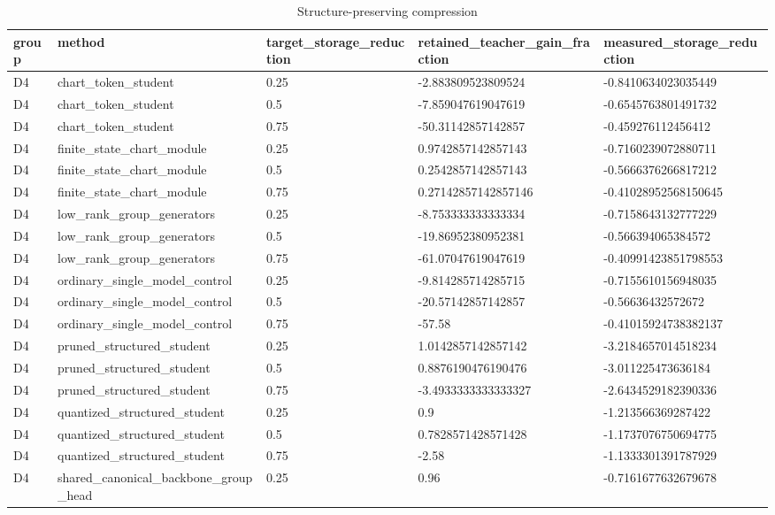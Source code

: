 \begin{table}[t]
\centering
\caption{Structure-preserving compression}
\begin{tabular}{lllll}
\toprule
group & method & target\_storage\_reduction & retained\_teacher\_gain\_fraction & measured\_storage\_reduction \\
\midrule
D4 & chart\_token\_student & 0.25 & -2.883809523809524 & -0.8410634023035449 \\
D4 & chart\_token\_student & 0.5 & -7.859047619047619 & -0.6545763801491732 \\
D4 & chart\_token\_student & 0.75 & -50.31142857142857 & -0.459276112456412 \\
D4 & finite\_state\_chart\_module & 0.25 & 0.9742857142857143 & -0.7160239072880711 \\
D4 & finite\_state\_chart\_module & 0.5 & 0.2542857142857143 & -0.5666376266817212 \\
D4 & finite\_state\_chart\_module & 0.75 & 0.27142857142857146 & -0.41028952568150645 \\
D4 & low\_rank\_group\_generators & 0.25 & -8.753333333333334 & -0.7158643132777229 \\
D4 & low\_rank\_group\_generators & 0.5 & -19.86952380952381 & -0.566394065384572 \\
D4 & low\_rank\_group\_generators & 0.75 & -61.07047619047619 & -0.40991423851798553 \\
D4 & ordinary\_single\_model\_control & 0.25 & -9.814285714285715 & -0.7155610156948035 \\
D4 & ordinary\_single\_model\_control & 0.5 & -20.57142857142857 & -0.56636432572672 \\
D4 & ordinary\_single\_model\_control & 0.75 & -57.58 & -0.41015924738382137 \\
D4 & pruned\_structured\_student & 0.25 & 1.0142857142857142 & -3.2184657014518234 \\
D4 & pruned\_structured\_student & 0.5 & 0.8876190476190476 & -3.011225473636184 \\
D4 & pruned\_structured\_student & 0.75 & -3.4933333333333327 & -2.6434529182390336 \\
D4 & quantized\_structured\_student & 0.25 & 0.9 & -1.213566369287422 \\
D4 & quantized\_structured\_student & 0.5 & 0.7828571428571428 & -1.1737076750694775 \\
D4 & quantized\_structured\_student & 0.75 & -2.58 & -1.1333301391787929 \\
D4 & shared\_canonical\_backbone\_group\_head & 0.25 & 0.96 & -0.7161677632679678 \\

\end{tabular}
\end{table}
